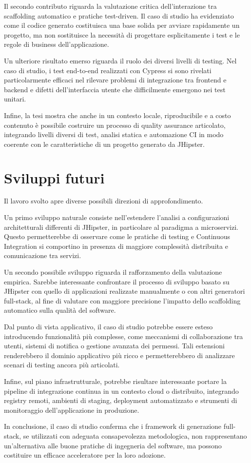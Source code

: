 Il secondo contributo riguarda la valutazione critica dell'interazione tra scaffolding automatico e pratiche test-driven. Il caso di studio ha evidenziato come il codice generato costituisca una base solida per avviare rapidamente un progetto, ma non sostituisce la necessità di progettare esplicitamente i test e le regole di business dell'applicazione.

Un ulteriore risultato emerso riguarda il ruolo dei diversi livelli di testing. Nel caso di studio, i test end-to-end realizzati con Cypress si sono rivelati particolarmente efficaci nel rilevare problemi di integrazione tra frontend e backend e difetti dell'interfaccia utente che difficilmente emergono nei test unitari.

Infine, la tesi mostra che anche in un contesto locale, riproducibile e a costo contenuto è possibile costruire un processo di quality assurance articolato, integrando livelli diversi di test, analisi statica e automazione CI in modo coerente con le caratteristiche di un progetto generato da JHipster.

\section{Sviluppi futuri}

Il lavoro svolto apre diverse possibili direzioni di approfondimento.

Un primo sviluppo naturale consiste nell'estendere l'analisi a configurazioni architetturali differenti di JHipster, in particolare al paradigma a microservizi. Questo permetterebbe di osservare come le pratiche di testing e Continuous Integration si comportino in presenza di maggiore complessità distribuita e comunicazione tra servizi.

Un secondo possibile sviluppo riguarda il rafforzamento della valutazione empirica. Sarebbe interessante confrontare il processo di sviluppo basato su JHipster con quello di applicazioni realizzate manualmente o con altri generatori full-stack, al fine di valutare con maggiore precisione l'impatto dello scaffolding automatico sulla qualità del software.

Dal punto di vista applicativo, il caso di studio potrebbe essere esteso introducendo funzionalità più complesse, come meccanismi di collaborazione tra utenti, sistemi di notifica o gestione avanzata dei permessi. Tali estensioni renderebbero il dominio applicativo più ricco e permetterebbero di analizzare scenari di testing ancora più articolati.

Infine, sul piano infrastrutturale, potrebbe risultare interessante portare la pipeline di integrazione continua in un contesto cloud o distribuito, integrando registry remoti, ambienti di staging, deployment automatizzato e strumenti di monitoraggio dell'applicazione in produzione.

In conclusione, il caso di studio conferma che i framework di generazione full-stack, se utilizzati con adeguata consapevolezza metodologica, non rappresentano un'alternativa alle buone pratiche di ingegneria del software, ma possono costituire un efficace acceleratore per la loro adozione.
